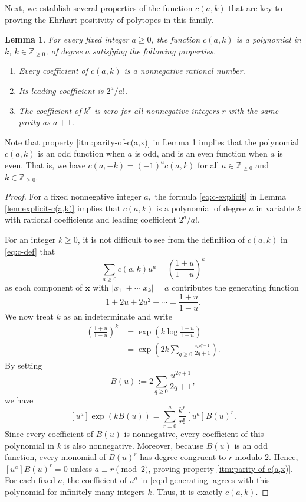 \documentclass[11pt,a4paper]{article}
\newcommand{\vct}[1]{\boldsymbol{#1}}
\newcommand{\Z}{\mathbb{Z}}
\newcommand{\1}{\mathbf{1}}
\theoremstyle{plain}
\newtheorem{lemma}[theorem]{Lemma}
\theoremstyle{definition}
\begin{document}
Next, we establish several properties of the function $c(a,k)$ that are key to proving the Ehrhart positivity of polytopes in this family.

\begin{lemma}\label{lem:properties-of-c(a,x)}
For every fixed integer $a\ge0$, the function $c(a,k)$ is a polynomial in $k$, $k \in \Z_{\geq 0}$, of degree $a$ satisfying the following properties.
\begin{enumerate}
\item\label{itm:nonnegative-coefficients-c(a,x)} Every coefficient of $c(a,k)$ is a nonnegative rational number.
\item\label{itm:leading-coefficient-c(a,x)} Its leading coefficient is $2^a/a!$.
\item\label{itm:parity-of-c(a,x)} The coefficient of $k^r$ is zero for all nonnegative integers $r$ with the same parity as $a+1$.
\end{enumerate}
\end{lemma}

Note that property \ref{itm:parity-of-c(a,x)} in Lemma \ref{lem:properties-of-c(a,x)} implies that the polynomial  $c(a,k)$ is an odd function when $a$ is odd, and is an even function when $a$ is even. That is, we have $c(a,-k) = (-1)^ac(a,k)$ for all $a \in \Z_{\geq 0}$ and $k \in \Z_{\geq 0}.$

\begin{proof} For a fixed nonnegative integer $a,$ the formula \eqref{eq:c-explicit} in Lemma \ref{lem:explicit-c(a,k)} implies that $c(a,k)$ is a polynomial of degree $a$ in variable $k$ with rational coefficients and leading coefficient $2^a/a!$.

For an integer $k \geq 0$, it is not difficult to see from the definition of $c(a,k)$ in \eqref{eq:c-def} that 
\begin{equation}
\sum_{a\ge0}c(a,k)u^a
=\left(\frac{1+u}{1-u}\right)^k
\label{eq:d-generating}
\end{equation}
as each component of $\vct{x}$ with $|x_1| + \cdots |x_k| = a$ contributes the generating function \[1+2u+2u^2+\cdots=\frac{1+u}{1-u}.\]
We now treat $k$ as an indeterminate and write
\begin{align*}
\left(\frac{1+u}{1-u}\right)^k
&=\exp\left(k\log\frac{1+u}{1-u}\right)\\
&=\exp\left(2k\sum_{q\ge0}\frac{u^{2q+1}}{2q+1}\right).
\end{align*}
By setting
\[
B(u):=2\sum_{q\ge0}\frac{u^{2q+1}}{2q+1},
\]
we have
\[
[u^a]\exp(kB(u))
=\sum_{r=0}^a\frac{k^r}{r!}[u^a]B(u)^r.
\]
Since every coefficient of $B(u)$ is nonnegative, every coefficient of this polynomial in $k$ is also nonnegative. Moreover, because $B(u)$ is an odd function, every monomial of $B(u)^r$ has degree congruent to $r$ modulo $2$. Hence, $[u^a]B(u)^r=0$ unless $a\equiv r\pmod 2$, proving property \ref{itm:parity-of-c(a,x)}. For each fixed $a$, the coefficient of $u^a$ in \eqref{eq:d-generating} agrees with this polynomial for infinitely many integers $k$. Thus, it is exactly $c(a,k)$.
\end{proof}
\end{document}
